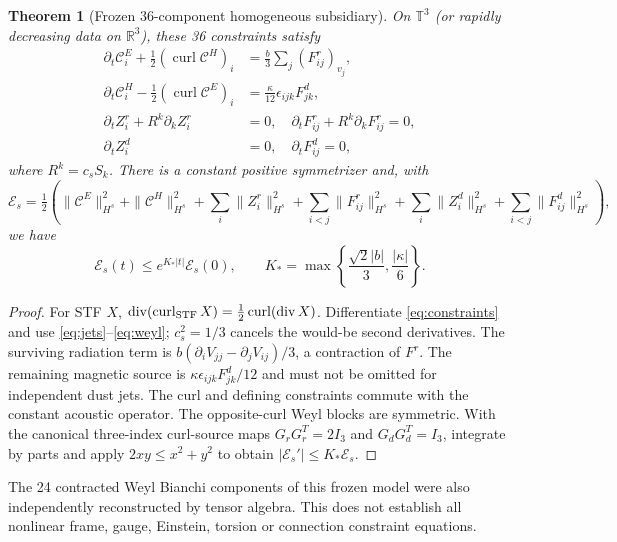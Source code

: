 \documentclass[11pt,a4paper]{article}
\newtheorem{theorem}{Theorem}[section]
\newcommand{\RR}{\mathbb R}
\newcommand{\TT}{\mathbb T}
\newcommand{\cC}{\mathcal C}
\newcommand{\diver}{\operatorname{div}}
\newcommand{\curl}{\operatorname{curl}}
\newcommand{\kap}{\kappa}
\begin{document}
\begin{theorem}[Frozen 36-component homogeneous subsidiary]\label{thm:36}
On $\TT^3$ (or rapidly decreasing data on $\RR^3$), these 36 constraints satisfy
\begin{align}
\partial_t\cC_i^E+\tfrac12(\curl\cC^H)_i&=\tfrac b3\sum_j(F_{ij}^r)_{v_j},\label{eq:ce}\\
\partial_t\cC_i^H-\tfrac12(\curl\cC^E)_i&=\tfrac\kap{12}\epsilon_{ijk}F_{jk}^d,\label{eq:ch}\\
\partial_t Z_i^r+R^k\partial_kZ_i^r&=0,\quad
\partial_tF_{ij}^r+R^k\partial_kF_{ij}^r=0,\nonumber\\
\partial_t Z_i^d&=0,\quad \partial_tF_{ij}^d=0,\nonumber
\end{align}
where $R^k=c_sS_k$. There is a constant positive symmetrizer and, with
\[\mathcal E_s=\tfrac12(\|\cC^E\|_{H^s}^2+\|\cC^H\|_{H^s}^2+
\sum_i\|Z_i^r\|_{H^s}^2+\sum_{i<j}\|F_{ij}^r\|_{H^s}^2+
\sum_i\|Z_i^d\|_{H^s}^2+\sum_{i<j}\|F_{ij}^d\|_{H^s}^2),\]
we have
\begin{equation}
\mathcal E_s(t)\le e^{K_*|t|}\mathcal E_s(0),\qquad
K_*=\max\left\{\frac{\sqrt2|b|}{3},\frac{|\kap|}{6}\right\}.\label{eq:E36}
\end{equation}
\end{theorem}
\begin{proof}
For STF $X$, $\diver(\curl_{\rm STF}X)=\tfrac12\curl(\diver X)$. Differentiate \eqref{eq:constraints} and use \eqref{eq:jets}--\eqref{eq:weyl}; $c_s^2=1/3$ cancels the would-be second derivatives. The surviving radiation term is $b(\partial_iV_{jj}-\partial_jV_{ij})/3$, a contraction of $F^r$. The remaining magnetic source is $\kap\epsilon_{ijk}F_{jk}^d/12$ and must not be omitted for independent dust jets. The curl and defining constraints commute with the constant acoustic operator. The opposite-curl Weyl blocks are symmetric. With the canonical three-index curl-source maps $G_rG_r^T=2I_3$ and $G_dG_d^T=I_3$, integrate by parts and apply $2xy\le x^2+y^2$ to obtain $|\mathcal E_s'|\le K_*\mathcal E_s$.\end{proof}

The 24 contracted Weyl Bianchi components of this frozen model were also independently reconstructed by tensor algebra. This does not establish all nonlinear frame, gauge, Einstein, torsion or connection constraint equations.
\end{document}
